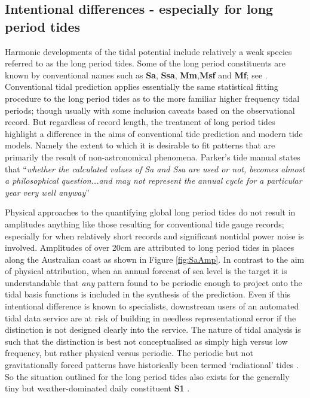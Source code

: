 \subsection{Intentional differences - especially for long period tides}
Harmonic developments of the tidal potential include relatively a weak species referred to as the long period tides.  Some of the long period constituents are known by conventional names such as \textbf{Sa}, \textbf{Ssa}, \textbf{Mm},\textbf{Msf} and \textbf{Mf}; see \cite[table 4] {10.1016/b978-0-444-53802-4.00058-0}.
Conventional tidal prediction applies essentially the same statistical fitting procedure to the long period tides as to the more familiar higher frequency tidal periods; though usually with some inclusion caveats based on the observational record. 
But regardless of record length, the treatment of long period tides highlight a difference in the aims of conventional tide prediction and modern tide models.   Namely the extent to which it is desirable to fit patterns that are primarily the result of non-astronomical phenomena.
Parker's tide manual states that ``\textit{whether the calculated values of Sa and Ssa are used or not, becomes almost a philosophical question...and may not represent the annual cycle for a particular year very well anyway}''  \citep[Section 3.7]{Parker:2007wq} 

Physical approaches to the quantifying global long period tides \citep{Egbert:1994wz} do not result in amplitudes anything like those resulting for conventional tide gauge records; especially for when relatively short records and significant nontidal power noise is involved.   Amplitudes of over 20cm are attributed to long period tides in places along the Australian coast as shown in Figure \ref{fig:SaAmp}. In contrast to the aim of physical attribution, when an annual forecast of sea level is the target it is understandable that \textit{any} pattern found to be periodic enough to project onto the tidal basis functions is included in the synthesis of the prediction. 
Even if this intentional difference is known to specialists, downstream users of an automated tidal data service are at risk of building in needless representational error if the distinction is not designed clearly into the service.
The nature of tidal analysis is such that the distinction is best not conceptualised as simply high versus low frequency, but rather physical versus periodic.   The periodic but not gravitationally forced patterns have historically been termed `radiational' tides \cite{10.1016/b978-0-444-53802-4.00058-0}.  So the situation outlined for the long period tides also exists for the generally tiny but weather-dominated daily constituent \textbf{S1} \cite{Ray:2004ts}.
 


